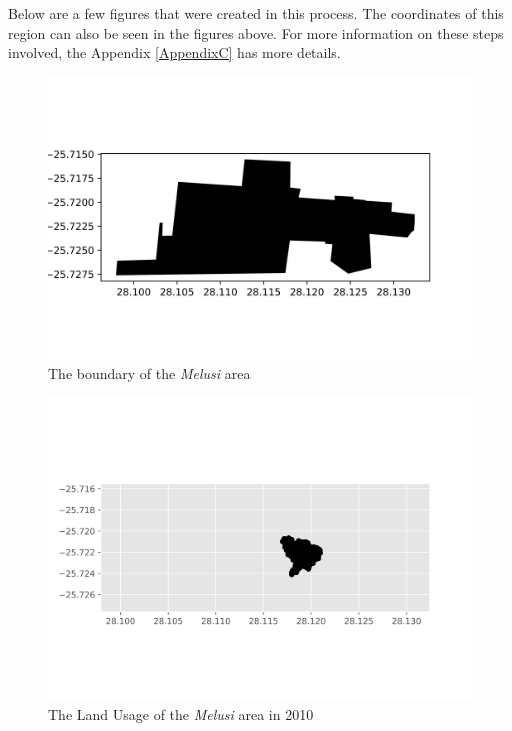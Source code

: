 Below are a few figures that were created in this process. The coordinates of this region can also be seen in the figures above.
For more information on these steps involved, the Appendix \ref{AppendixC} has more details.
\begin{figure}[H]
\centering
\includegraphics[width=1\textwidth]{Figures/Chapter3/MelusiArea}
\caption{The boundary of the \textit{Melusi} area}
\end{figure}
\begin{figure}[H]
\centering
\includegraphics[width=1\textwidth]{Figures/Chapter3/Melusi2010}
\caption{The Land Usage of the \textit{Melusi} area in 2010}
\label{fig:mel2010}
\end{figure}
